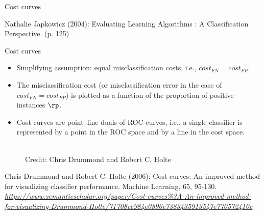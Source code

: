 \begin{vbframe}{Cost curves}
\begin{minipage}{0.49\textwidth}
\end{minipage}
\vspace{1.5 cm}
{\tiny{Nathalie Japkowicz (2004): Evaluating Learning Algorithms : A Classification Perspective. (p. 125)}}



\end{vbframe}


\begin{vbframe}{Cost curves}
\begin{footnotesize}
\begin{itemize}
  \item Simplifying assumption: equal misclassification costs, i.e., $cost_{FN} = cost_{FP}$.
  \item The misclassification cost (or misclassification error in the case of $cost_{FN} = cost_{FP}$) is plotted as a function of the proportion of positive instances $\rp$.
  \item Cost curves are point–line duals of ROC curves, i.e., a single classifier is represented by a point in the ROC space and by a line in the cost space.
\end{itemize}
\end{footnotesize}
\vspace{-0.5  cm}
\begin{figure}
    \centering
    \tiny{\\ Credit: Chris Drummond and Robert C. Holte  \\}
\end{figure}
\vspace{-0.25cm}
{\tiny{Chris Drummond and Robert C. Holte (2006): Cost curves: An improved method for visualizing classifier performance. Machine Learning, 65, 95-130. \emph{\url{https://www.semanticscholar.org/paper/Cost-curves\%3A-An-improved-method-for-visualizing-Drummond-Holte/71708ce984e0896e7383435913547e770572410e}}}\par}

\end{vbframe}



